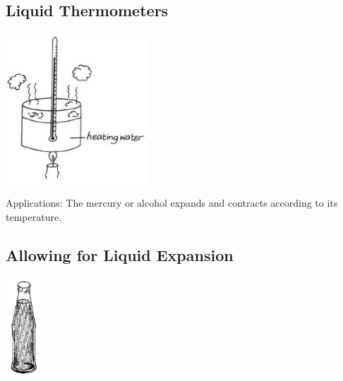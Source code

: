 \begin{multicols}{2}
\subsection{Liquid Thermometers}

\begin{center}
\includegraphics[width=0.4\textwidth]{./img/vso/liquid-thermometers.jpg}
\end{center}

\begin{description*}
\item[Applications:]{The mercury or alcohol expands and contracts according to its temperature.}
\end{description*}

\subsection{Allowing for Liquid Expansion}

\begin{center}
\includegraphics[width=0.1\textwidth]{./img/source/allowing-expansion-liquid.png}
\end{center}


\end{multicols}
